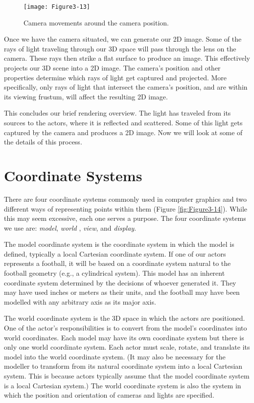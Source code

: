 \begin{figure}[!htb]
  \centering
  \texttt{[image: Figure3-13]}\\
  \caption{Camera movements around the camera position.}\label{fig:Figure3-13}
\end{figure}

Once we have the camera situated, we can generate our 2D image. Some of the rays of light traveling through our 3D space will pass through the lens on the camera. These rays then strike a flat surface to produce an image. This effectively projects our 3D scene into a 2D image. The camera's position and other properties determine which rays of light get captured and projected. More specifically, only rays of light that intersect the camera's position, and are within its viewing frustum, will affect the resulting 2D image.

This concludes our brief rendering overview. The light has traveled from its sources to the actors, where it is reflected and scattered. Some of this light gets captured by the camera and produces a 2D image. Now we will look at some of the details of this process.

\section{Coordinate Systems}
\label{sec:coordinate_systems}

There are four coordinate systems commonly used in computer graphics and two different ways of representing points within them (Figure \ref{fig:Figure3-14}). While this may seem excessive, each one serves a purpose. The four coordinate systems we use are: \emph{model}, \emph{world} , \emph{view}, and \emph{display}.

The model coordinate system is the coordinate system in which the model is defined, typically a local Cartesian coordinate system. If one of our actors represents a football, it will be based on a coordinate system natural to the football geometry (e.g., a cylindrical system). This model has an inherent coordinate system determined by the decisions of whoever generated it. They may have used inches or meters as their units, and the football may have been modelled with any arbitrary axis as its major axis.

The world coordinate system is the 3D space in which the actors are positioned. One of the actor's responsibilities is to convert from the model's coordinates into world coordinates. Each model may have its own coordinate system but there is only one world coordinate system. Each actor must scale, rotate, and translate its model into the world coordinate system. (It may also be necessary for the modeller to transform from its natural coordinate system into a local Cartesian system. This is because actors typically assume that the model coordinate system is a local Cartesian system.) The world coordinate system is also the system in which the position and orientation of cameras and lights are specified.

